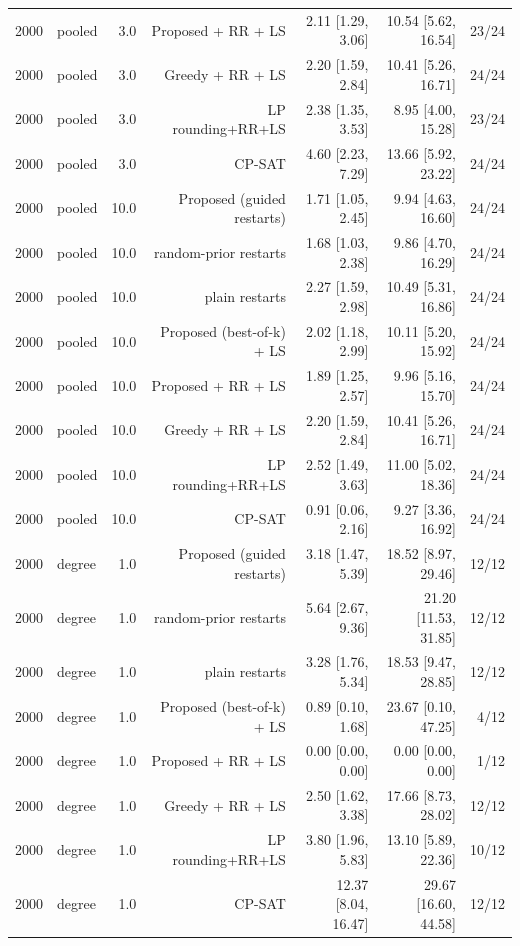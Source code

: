 \begin{table}[t]
\begin{tabular}{llrrrrr}
2000 & pooled & 3.0 & Proposed + RR + LS & 2.11 [1.29, 3.06] & 10.54 [5.62, 16.54] & 23/24 \\
2000 & pooled & 3.0 & Greedy + RR + LS & 2.20 [1.59, 2.84] & 10.41 [5.26, 16.71] & 24/24 \\
2000 & pooled & 3.0 & LP rounding+RR+LS & 2.38 [1.35, 3.53] & 8.95 [4.00, 15.28] & 23/24 \\
2000 & pooled & 3.0 & CP-SAT & 4.60 [2.23, 7.29] & 13.66 [5.92, 23.22] & 24/24 \\
2000 & pooled & 10.0 & Proposed (guided restarts) & 1.71 [1.05, 2.45] & 9.94 [4.63, 16.60] & 24/24 \\
2000 & pooled & 10.0 & random-prior restarts & 1.68 [1.03, 2.38] & 9.86 [4.70, 16.29] & 24/24 \\
2000 & pooled & 10.0 & plain restarts & 2.27 [1.59, 2.98] & 10.49 [5.31, 16.86] & 24/24 \\
2000 & pooled & 10.0 & Proposed (best-of-k) + LS & 2.02 [1.18, 2.99] & 10.11 [5.20, 15.92] & 24/24 \\
2000 & pooled & 10.0 & Proposed + RR + LS & 1.89 [1.25, 2.57] & 9.96 [5.16, 15.70] & 24/24 \\
2000 & pooled & 10.0 & Greedy + RR + LS & 2.20 [1.59, 2.84] & 10.41 [5.26, 16.71] & 24/24 \\
2000 & pooled & 10.0 & LP rounding+RR+LS & 2.52 [1.49, 3.63] & 11.00 [5.02, 18.36] & 24/24 \\
2000 & pooled & 10.0 & CP-SAT & 0.91 [0.06, 2.16] & 9.27 [3.36, 16.92] & 24/24 \\
2000 & degree & 1.0 & Proposed (guided restarts) & 3.18 [1.47, 5.39] & 18.52 [8.97, 29.46] & 12/12 \\
2000 & degree & 1.0 & random-prior restarts & 5.64 [2.67, 9.36] & 21.20 [11.53, 31.85] & 12/12 \\
2000 & degree & 1.0 & plain restarts & 3.28 [1.76, 5.34] & 18.53 [9.47, 28.85] & 12/12 \\
2000 & degree & 1.0 & Proposed (best-of-k) + LS & 0.89 [0.10, 1.68] & 23.67 [0.10, 47.25] & 4/12 \\
2000 & degree & 1.0 & Proposed + RR + LS & 0.00 [0.00, 0.00] & 0.00 [0.00, 0.00] & 1/12 \\
2000 & degree & 1.0 & Greedy + RR + LS & 2.50 [1.62, 3.38] & 17.66 [8.73, 28.02] & 12/12 \\
2000 & degree & 1.0 & LP rounding+RR+LS & 3.80 [1.96, 5.83] & 13.10 [5.89, 22.36] & 10/12 \\
2000 & degree & 1.0 & CP-SAT & 12.37 [8.04, 16.47] & 29.67 [16.60, 44.58] & 12/12 \\

\end{tabular}
\end{table}
